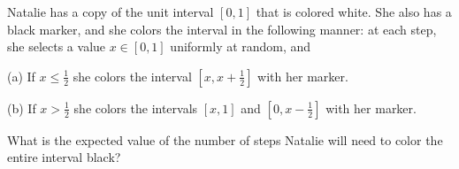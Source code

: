 Natalie has a copy of the unit interval $[0,1]$ that is colored white. She also has a black marker, and she colors the interval in the following manner: at each step, she selects a value $x\in [0,1]$ uniformly at random, and

(a) If $x\leq\tfrac12$ she colors the interval $[x,x+\tfrac12]$ with her marker.

(b) If $x>\tfrac12$ she colors the intervals $[x,1]$ and $[0,x-\tfrac12]$ with her marker.

What is the expected value of the number of steps Natalie will need to color the entire interval black?